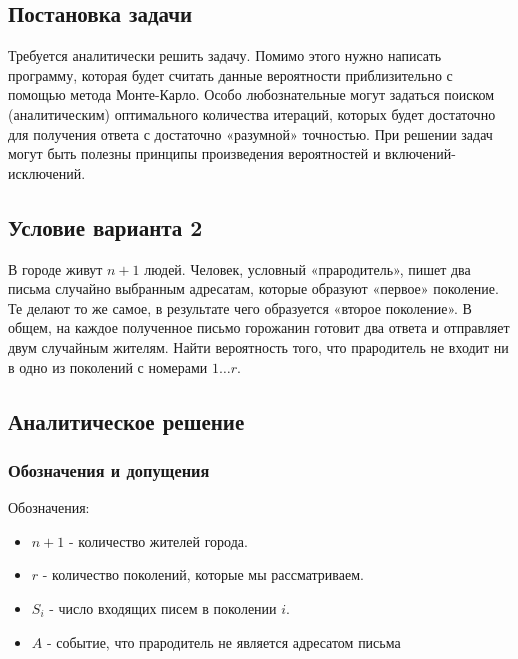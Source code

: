 \documentclass[a4paper,14pt]{extarticle}
\begin{document}
        \subsection*{Постановка задачи}
            
            Требуется аналитически решить задачу. Помимо этого нужно написать программу, которая будет считать данные вероятности приблизительно с помощью метода Монте-Карло. Особо любознательные могут задаться поиском (аналитическим) оптимального количества итераций, которых будет достаточно для получения ответа с достаточно «разумной» точностью. При решении задач могут быть полезны принципы произведения вероятностей и включений-исключений.
        
        \subsection*{Условие варианта 2}
            
            В городе живут \( n + 1 \) людей. Человек, условный «прародитель», пишет два письма случайно выбранным адресатам, которые образуют «первое» поколение. Те делают то же самое, в результате чего образуется «второе поколение». В общем, на каждое полученное письмо горожанин готовит два ответа и отправляет двум случайным жителям. Найти вероятность того, что прародитель не входит ни в одно из поколений с номерами \( 1 \ldots r \).
        
        \subsection*{Аналитическое решение}
            
            \subsubsection*{Обозначения и допущения}
                
                Обозначения:
                \begin{itemize}
                    \item \( n + 1 \) - количество жителей города.
                    \item \( r \) - количество поколений, которые мы рассматриваем.
                    \item \( S_i \) - число входящих писем в поколении \( i \).
                    \item \( A \) - событие, что прародитель не является адресатом письма
                \end{itemize}
                
\end{document}

